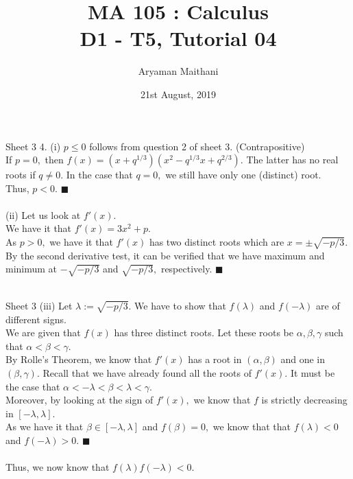 \documentclass[handout, aspectratio=169]{beamer}
\title{MA 105 : Calculus\\ D1 - T5, Tutorial 04}  %
\author{Aryaman Maithani}
\date[21-08-2019]{21st August, 2019}               %
\institute[IITB]{IIT Bombay}
\begin{document}
\begin{frame}
	\titlepage
\end{frame}
\begin{frame}{Sheet 3}                            %
	4. (i) $p \le 0$ follows from question 2 of sheet 3. (Contrapositive)\\
	If $p = 0,$ then $f(x) = (x + q^{1/3})(x^2 - q^{1/3}x + q^{2/3}).$ The latter has no real roots if $q \neq 0.$ In the case that $q = 0,$ we still have only one (distinct) root.\\
	Thus, $p < 0.$ \hfill $\blacksquare$ \\~\\
	(ii) Let us look at $f'(x).$ \\
	We have it that $f'(x) = 3x^2 + p.$\\
	As $p > 0,$ we have it that $f'(x)$ has two distinct roots which are $x = \pm \sqrt{-p/3}.$\\
	By the second derivative test, it can be verified that we have maximum and minimum at $-\sqrt{-p/3}$ and $\sqrt{-p/3},$ respectively. \hfill $\blacksquare$ \\~\\
\end{frame}
\begin{frame}{Sheet 3}
	(iii) Let $\lambda := \sqrt{-p/3}.$ We have to show that $f(\lambda)$ and $f(-\lambda)$ are of different signs.\\
	We are given that $f(x)$ has three distinct roots. Let these roots be $\alpha, \beta, \gamma$ such that $\alpha < \beta < \gamma.$\\
	By Rolle's Theorem, we know that $f'(x)$ has a root in $(\alpha, \beta)$ and one in $(\beta, \gamma).$ Recall that we have already found all the roots of $f'(x).$ It must be the case that $\alpha < -\lambda < \beta < \lambda < \gamma.$\\
	Moreover, by looking at the sign of $f'(x),$ we know that $f$ is strictly decreasing in $[-\lambda, \lambda].$\\
	As we have it that $\beta \in [-\lambda, \lambda]$ and $f(\beta) = 0,$ we know that that $f(\lambda) < 0$ and $f(-\lambda) > 0.$ \hfill $\blacksquare$\\~\\
	Thus, we now know that $f(\lambda)f(-\lambda) < 0.$
\end{frame}
\end{document}
